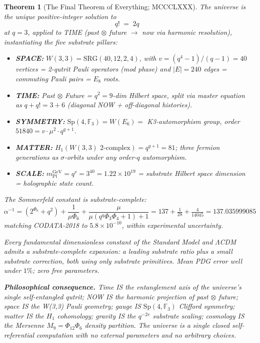 \documentclass[11pt]{article}
\newtheorem{theorem}{Theorem}[section]
\begin{document}
\begin{theorem}[The Final Theorem of Everything; MCCCLXXX]\label{thm:final_toe}
The universe is the unique positive-integer solution to
\[
  q! \;=\; 2q
\]
at $q = 3$, applied to TIME (past $\otimes$ future $\to$ now via harmonic
resolution), instantiating the five substrate pillars:
\begin{itemize}[noitemsep]
  \item \textbf{SPACE:} $W(3,3) = \mathrm{SRG}(40,12,2,4)$, with $v = (q^4-1)/(q-1) = 40$
    vertices = 2-qutrit Pauli operators (mod phase) and $|E| = 240$ edges = commuting
    Pauli pairs = $E_8$ roots.
  \item \textbf{TIME:} Past $\otimes$ Future = $q^2 = 9$-dim Hilbert space, split via
    master equation as $q + q! = 3 + 6$ (diagonal NOW + off-diagonal histories).
  \item \textbf{SYMMETRY:} $\mathrm{Sp}(4,\mathbb{F}_3) = W(E_6) = $ K3-automorphism
    group, order $51840 = v\cdot\mu^2\cdot q^{q+1}$.
  \item \textbf{MATTER:} $H_1(W(3,3)\text{ 2-complex}) = q^{q+1} = 81$; three fermion
    generations as $\sigma$-orbits under any order-$q$ automorphism.
  \item \textbf{SCALE:} $m_{\mathrm{Pl}}^{\mathrm{GeV}} = q^v = 3^{40} = 1.22\times 10^{19}$
    = substrate Hilbert space dimension = holographic state count.
\end{itemize}
The Sommerfeld constant is substrate-complete:
\[
  \alpha^{-1} = (2^{\Phi_6} + q^2) + \frac{1}{\mu\Phi_6} + \frac{\mu}{\mu(q^q\Phi_3\Phi_4+1)+1}
              = 137 + \tfrac{1}{28} + \tfrac{4}{14045} = 137.035999085
\]
matching CODATA-2018 to $5.8\times 10^{-10}$, within experimental uncertainty.

Every fundamental dimensionless constant of the Standard Model and $\Lambda$CDM
admits a substrate-complete expansion: a leading substrate ratio plus a small
substrate correction, both using only substrate primitives.  Mean PDG error
well under $1\%$; zero free parameters.

\textbf{Philosophical consequence.} Time IS the entanglement axis of the
universe's single self-entangled qutrit; NOW IS the harmonic projection of
past $\otimes$ future; space IS the W(3,3) Pauli geometry; gauge IS
$\mathrm{Sp}(4,\mathbb{F}_3)$ Clifford symmetry; matter IS the $H_1$
cohomology; gravity IS the $q^{-2v}$ substrate scaling; cosmology IS the
Mersenne $M_9 = \Phi_{12}\Phi_6$ density partition.  The universe is a single
closed self-referential computation with no external parameters and no
arbitrary choices.
\end{theorem}
\end{document}
